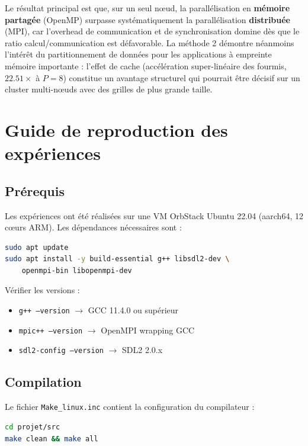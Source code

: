 \documentclass[11pt,a4paper]{article}
\begin{document}
Le résultat principal est que, sur un seul nœud, la parallélisation en \textbf{mémoire partagée} (OpenMP) surpasse systématiquement la parallélisation \textbf{distribuée} (MPI), car l'overhead de communication et de synchronisation domine dès que le ratio calcul/communication est défavorable. La méthode 2 démontre néanmoins l'intérêt du partitionnement de données pour les applications à empreinte mémoire importante : l'effet de cache (accélération super-linéaire des fourmis, $22.51\times$ à $P=8$) constitue un avantage structurel qui pourrait être décisif sur un cluster multi-nœuds avec des grilles de plus grande taille.

\newpage
\appendix
\section{Guide de reproduction des expériences}

\subsection{Prérequis}

Les expériences ont été réalisées sur une VM OrbStack Ubuntu 22.04 (aarch64, 12 cœurs ARM). Les dépendances nécessaires sont :

\begin{lstlisting}[language=bash, caption={Installation des dépendances}]
sudo apt update
sudo apt install -y build-essential g++ libsdl2-dev \
    openmpi-bin libopenmpi-dev
\end{lstlisting}

Vérifier les versions :
\begin{itemize}[nosep]
    \item \texttt{g++ --version} $\rightarrow$ GCC 11.4.0 ou supérieur
    \item \texttt{mpic++ --version} $\rightarrow$ OpenMPI wrapping GCC
    \item \texttt{sdl2-config --version} $\rightarrow$ SDL2 2.0.x
\end{itemize}

\subsection{Compilation}

Le fichier \texttt{Make\_linux.inc} contient la configuration du compilateur :
\begin{lstlisting}[language=bash, caption={Compilation de toutes les cibles}]
cd projet/src
make clean && make all
\end{lstlisting}
\end{document}
